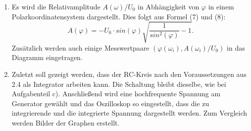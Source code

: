 \begin{enumerate}
	\item Es wird die Relativamplitude $A(\omega) / U_0$ in Abhängigkeit von $\varphi$ in einem Polarkoordinatensystem dargestellt.
	Dies folgt aus Formel (7) und (8):
	\begin{equation}
	A(\varphi) = -U_0\cdot sin(\varphi)\sqrt{\frac{1}{sin^2(\varphi)}-1}\text{.}
	\end{equation}
	Zusätzlich werden auch einige Messwertpaare $(\varphi(\omega_i), A(\omega_i)/U_0)$ in das Diagramm
	eingetragen.

       \item Zuletzt soll gezeigt werden, dass der RC-Kreis nach den Voraussetzungen aus 2.4 als
       Integrator arbeiten kann. Die Schaltung bleibt dieselbe, wie bei Aufgabenteil c).
       Anschließend wird eine hochfrequente Spannung am Generator gewählt und das Oszilloskop so eingestellt, dass
       die zu integrierende und die integrierte Spannung dargestellt werden. Zum Vergleich werden
       Bilder der Graphen erstellt.

       

\end{enumerate}

